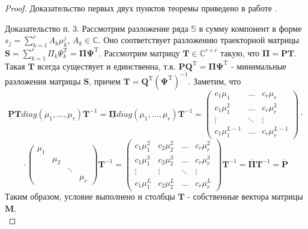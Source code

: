 \documentclass[specialist,
               substylefile = spbu_report.rtx,
               subf,href,colorlinks=true, 12pt]{disser}
\theoremstyle{definition}
\begin{document}
\begin{proof}
Доказательство первых двух пунктов теоремы приведено в работе \cite{Huffel94}.

Доказательство п. 3. Рассмотрим разложение ряда $\mathbb{S}$ в сумму компонент в форме $s_j = \sum_{k = 1}^{r}A_k\mu_k^j$, $A_k \in \mathbb{C}$. Оно соответствует разложению траекторной матрицы $\mathbf{S} = \sum_{k = 1}^{r}\Pi_k\Psi_k^{\mathrm{T}} = \mathbf{\Pi\Psi}^{\mathrm{T}}$. Рассмотрим матрицу $\mathbf{T} \in \mathbb{C}^{r \times r}$ такую, что $\mathbf{\Pi} = \mathbf{PT}$. Такая $\mathbf{T}$ всегда существует и единственна, т.к. $\mathbf{PQ}^{\mathrm{T}} = \mathbf{\Pi\Psi}^{\mathrm{T}}$ - минимальные разложения матрицы $\mathbf{S}$, причем $\mathbf{T} = \mathbf{Q}^{\mathrm{T}}(\mathbf{\Psi}^{\mathrm{T}})^{-1}$. Заметим, что 
\begin{equation*}
   \underline{\mathbf{P}}\mathbf{T}diag(\mu_1, \ldots, \mu_r)\mathbf{T}^{-1} = \underline{\mathbf{\Pi}}diag(\mu_1, \ldots, \mu_r)\mathbf{T}^{-1} = \begin{pmatrix}
        c_1\mu_1& \dots& c_r\mu_r \\
        c_1\mu_1^2& \dots& c_r\mu_r^2 \\
        \vdots& \ddots& \vdots \\
        c_1\mu_1^{L - 1}& \dots& c_r\mu_r^{L - 1}
   \end{pmatrix} \cdot 
\end{equation*}
\begin{equation*}
\cdot
    \begin{pmatrix}
        \mu_1 & & & \\
        & \mu_2 & & \\
        & & \ddots & \\
        & & & \mu_r
    \end{pmatrix}
    \mathbf{T}^{-1} = \begin{pmatrix}
        c_1\mu_1^2 & c_2\mu_2^2 & \dots & c_r\mu_r^2 \\
        c_1\mu_1^3 & c_2\mu_2^3 & \dots & c_r\mu_r^3 \\
        \vdots & \vdots & \ddots & \vdots \\
        c_1\mu_1^L & c_2\mu_2^L & \dots & c_r\mu_r^L
    \end{pmatrix}
    \mathbf{T}^{-1} = \overline{\mathbf{\Pi}}\mathbf{T}^{-1} = \overline{\mathbf{P}}
\end{equation*}
Таким образом, условие выполнено и столбцы $\mathbf{T}$ - собственные вектора матрицы $\mathbf{M}$. \\

\end{proof}
\end{document}
